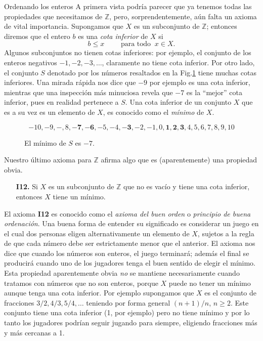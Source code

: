 \documentclass[11pt,spanish,makeidx]{amsbook}
\theoremstyle{definition}
\theoremstyle{remark}
\begin{document}
\begin{section}{Ordenando los enteros}
A primera vista podría parecer que ya tenemos todas las propiedades que necesitamos de $\mathbb Z$, pero, sorprendentemente, aún falta un axioma de vital importancia. Supongamos que $X$ es un subconjunto de $\mathbb Z$; entonces diremos que el entero $b$ es una {\em cota inferior} de $X$ si
\begin{equation*}
	b\le x \qquad \text{ para todo } \ x \in X.
\end{equation*}
Algunos subconjuntos no tienen cotas inferiores: por ejemplo, el conjunto de los enteros negativos $-1,-2,-3,\ldots$, claramente no tiene cota inferior. Por otro lado, el conjunto $S$ denotado por los números resaltados en la Fig.\ref{f1.1} tiene muchas cotas inferiores. Una mirada rápida nos dice que $-9$ por ejemplo es una cota inferior, mientras que una inspección más minuciosa revela que $-7$ es la ``mejor'' cota inferior, pues en realidad pertenece a $S$. Una cota inferior de un conjunto $X$ que es a su vez es un elemento de $X$, es conocido como el {\em mínimo} de $X$.


\begin{figure}[ht]
$$
-10,-9,-,8,\mathbf{-7},\mathbf{-6},-5,-4,\mathbf{-3},-2,-1,0,\mathbf{1},\mathbf{2},\mathbf{3}, 4,5,6,7,8,9,10
$$
\caption{El mínimo de $S$ es $-7$.}\label{f1.1}
\end{figure}

Nuestro último axioma para $\mathbb Z$ afirma algo que es (aparentemente) una propiedad obvia.

\begin{enumerate}
\item[{\bf I12.}] Si $X$ es un subconjunto de $\mathbb Z$ que no es vacío y tiene una cota inferior, entonces $X$ tiene un mínimo.
\end{enumerate}

El axioma {\bf I12} es conocido como el {\em axioma del buen orden} o {\em principio de buena ordenación}.  Una buena forma de entender su significado es considerar un juego en el cual dos personas eligen alternativamente un elemento de $X$, sujetos a la regla de que cada número debe ser estrictamente menor que el anterior. El axioma nos dice que cuando los números son enteros, el juego terminará; además el final se producirá cuando uno de los jugadores tenga el buen sentido de elegir el mínimo. Esta propiedad aparentemente obvia {\it no} se mantiene necesariamente cuando tratamos con números que no son enteros, porque $X$ puede no tener un mínimo aunque tenga una cota inferior. Por ejemplo supongamos que $X$ es el conjunto de fracciones $3/2,4/3,5/4,\ldots$ teniendo por forma general $(n+1)/n$, $n\ge 2$. Este conjunto tiene una cota inferior (1, por ejemplo) pero no tiene mínimo y por lo tanto los jugadores podrían seguir jugando para siempre, eligiendo fracciones más y más cercanas a 1.


\end{section}
\end{document}
